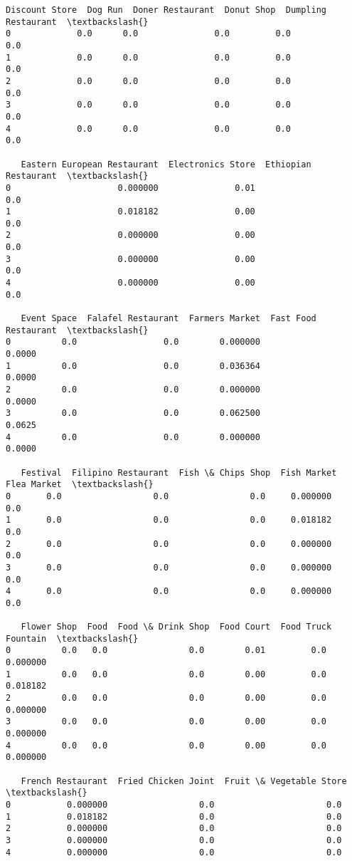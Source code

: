 \documentclass[11pt]{article}
\begin{document}
\begin{tcolorbox}[breakable, size=fbox, boxrule=.5pt, pad at break*=1mm, opacityfill=0]
\begin{Verbatim}[commandchars=\\\{\}]
   Discount Store  Dog Run  Doner Restaurant  Donut Shop  Dumpling Restaurant  \textbackslash{}
0             0.0      0.0               0.0         0.0                  0.0
1             0.0      0.0               0.0         0.0                  0.0
2             0.0      0.0               0.0         0.0                  0.0
3             0.0      0.0               0.0         0.0                  0.0
4             0.0      0.0               0.0         0.0                  0.0

   Eastern European Restaurant  Electronics Store  Ethiopian Restaurant  \textbackslash{}
0                     0.000000               0.01                   0.0
1                     0.018182               0.00                   0.0
2                     0.000000               0.00                   0.0
3                     0.000000               0.00                   0.0
4                     0.000000               0.00                   0.0

   Event Space  Falafel Restaurant  Farmers Market  Fast Food Restaurant  \textbackslash{}
0          0.0                 0.0        0.000000                0.0000
1          0.0                 0.0        0.036364                0.0000
2          0.0                 0.0        0.000000                0.0000
3          0.0                 0.0        0.062500                0.0625
4          0.0                 0.0        0.000000                0.0000

   Festival  Filipino Restaurant  Fish \& Chips Shop  Fish Market  Flea Market  \textbackslash{}
0       0.0                  0.0                0.0     0.000000          0.0
1       0.0                  0.0                0.0     0.018182          0.0
2       0.0                  0.0                0.0     0.000000          0.0
3       0.0                  0.0                0.0     0.000000          0.0
4       0.0                  0.0                0.0     0.000000          0.0

   Flower Shop  Food  Food \& Drink Shop  Food Court  Food Truck  Fountain  \textbackslash{}
0          0.0   0.0                0.0        0.01         0.0  0.000000
1          0.0   0.0                0.0        0.00         0.0  0.018182
2          0.0   0.0                0.0        0.00         0.0  0.000000
3          0.0   0.0                0.0        0.00         0.0  0.000000
4          0.0   0.0                0.0        0.00         0.0  0.000000

   French Restaurant  Fried Chicken Joint  Fruit \& Vegetable Store  \textbackslash{}
0           0.000000                  0.0                      0.0
1           0.018182                  0.0                      0.0
2           0.000000                  0.0                      0.0
3           0.000000                  0.0                      0.0
4           0.000000                  0.0                      0.0


\end{Verbatim}
\end{tcolorbox}
\end{document}
